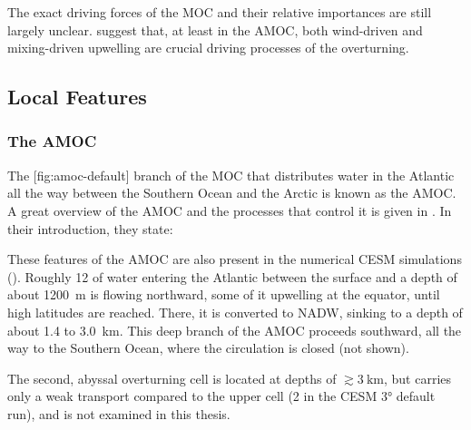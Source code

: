 The exact driving forces of the \ac{MOC} and their relative importances are still largely unclear. \citeauthor{kuhlbrodt} suggest that, at least in the \ac{AMOC}, both wind-driven and mixing-driven upwelling are crucial driving processes of the overturning.

\subsection{Local Features}
\subsubsection{The \acf{AMOC}}
The%
[fig:amoc-default]%
{}%
%
branch of the \ac{MOC} that distributes water in the Atlantic all the way between the Southern Ocean and the Arctic is known as the \ac{AMOC}. A great overview of the \ac{AMOC} and the processes that control it is given in \cite{kuhlbrodt}. In their introduction, they state:


These features of the \ac{AMOC} are also present in the numerical \ac{CESM} simulations (). Roughly \SI{12}{\sv} of water entering the Atlantic between the surface and a depth of about \SI{1200}{\metre} is flowing northward, some of it upwelling at the equator, until high latitudes are reached. There, it is converted to \ac{NADW}, sinking to a depth of about \num{1.4} to \SI{3.0}{\kilo\metre}. This deep branch of the \ac{AMOC} proceeds southward, all the way to the Southern Ocean, where the circulation is closed (not shown).

The second, abyssal overturning cell is located at depths of \(\gtrsim \SI{3}{\kilo\metre}\), but carries only a weak transport compared to the upper cell (\SI{2}{\sv} in the \ac{CESM} \ang{3} default run), and is not examined in this thesis.

